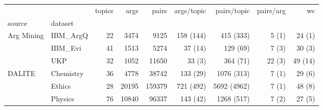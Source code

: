 \begin{tabular}{llrrrrrrr}
\toprule
       &         &  topics &   args &   pairs & args/topic &  pairs/topic & pairs/arg &       wc \\
source & dataset &         &        &         &            &              &           &          \\
\midrule
Arg Mining & IBM\_ArgQ\cite{toledo_automatic_2019} &      22 &   3474 &    9125 
&  158 (144) &    415 (333) &     5 (1) &   24 (1) \\
       & IBM\_Evi\cite{gleize_are_2019} &      41 &   1513 &    5274 &    37 
       (14) &     129 (69) &     7 (3) &   30 (3) \\
       & UKP\cite{habernal_which_2016} &      32 &   1052 &   11650 &     33 
       (3) &     364 (71) &    22 (3) &  49 (14) \\
DALITE & Chemistry &      36 &   4778 &   38742 &   133 (29) &   1076 (313) &     7 (1) &   29 (6) \\
       & Ethics &      28 &  20195 &  159379 &  721 (492) &  5692 (4962) &     7 (1) &   48 (8) \\
       & Physics &      76 &  10840 &   96337 &   143 (42) &   1268 (517) &     7 (2) &   27 (5) \\
\bottomrule
\end{tabular}
